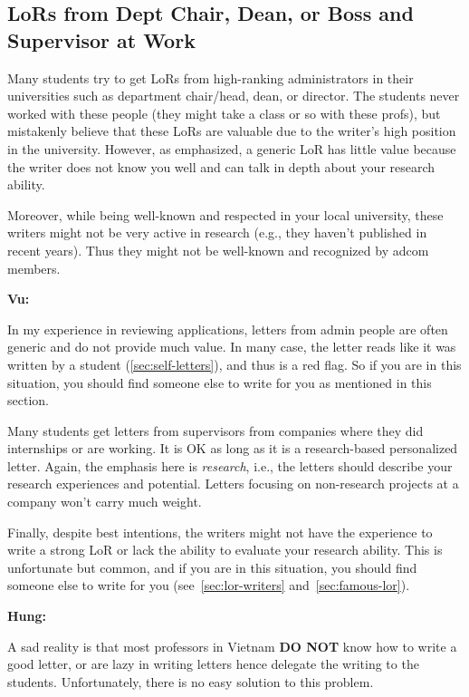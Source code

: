 \documentclass[oneside,11pt,dvipsnames]{book}
\newenvironment{commentbox}[1][]{
  \small
  \begin{mybox}
    {\small \textbf{#1}}
  }{
  \end{mybox}
}
\begin{document}
  \subsection{LoRs from Dept Chair, Dean, or Boss and Supervisor at Work}\label{sec:admin-letters}

  Many students try to get LoRs from high-ranking administrators in their universities such as department chair/head, dean, or director. The students never worked with these people (they might take a class or so with these profs), but mistakenly believe that these LoRs are valuable due to the writer's high position in the university.
  However, as emphasized, a generic LoR has little value because the writer does not know you well and can talk in depth about your research ability. 
  
  Moreover, while being well-known and respected in your local university, these writers might not be very active in research (e.g., they haven't published in recent years). Thus they might not be well-known and recognized by adcom members.  




  \begin{commentbox}[Vu:]
    In my experience in reviewing applications, letters from admin people are often generic and do not provide much value. 
    In many case, the letter reads like it was written by a student (\autoref{sec:self-letters}), and thus is a red flag.  So if you are in this situation, you should find someone else to write for you as mentioned in this section.
  \end{commentbox}
  
  Many students get letters from supervisors from companies where they did internships or are working.  It is OK as long as it is a research-based personalized letter. Again, the emphasis here is \emph{research}, i.e., the letters should describe your research experiences and potential. Letters focusing on non-research projects at a company won't carry much weight.

Finally, despite best intentions, the writers might not have the experience to write a strong LoR or lack the ability to evaluate your research ability.
This is unfortunate but common, and if you are in this situation, you should find someone else to write for you (see~\autoref{sec:lor-writers} and~\autoref{sec:famous-lor}).


\begin{commentbox}[Hung:]
    A sad reality is that most professors in Vietnam \textbf{DO NOT} know how to write a good letter, or are lazy in writing letters hence delegate the writing to the students. Unfortunately, there is no easy solution to this problem.
\end{commentbox}
\end{document}
